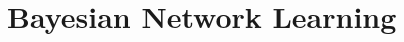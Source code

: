 \documentclass[runningheads,a4paper]{llncs}
\renewcommand{\marginpar}[1]{\fixneeded{(AS MARGINPAR) #1}}
\newcommand{\fixneeded}[1]{\textbf{[\footnotesize #1]}}
\begin{document}

%


\section{Bayesian Network Learning} \label{sec:bnlearning}
\end{document}
